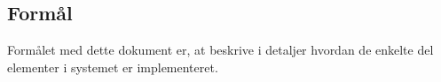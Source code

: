 \subsection{Formål}
Formålet med dette dokument er, at beskrive i detaljer hvordan de enkelte del elementer i systemet er implementeret. 
